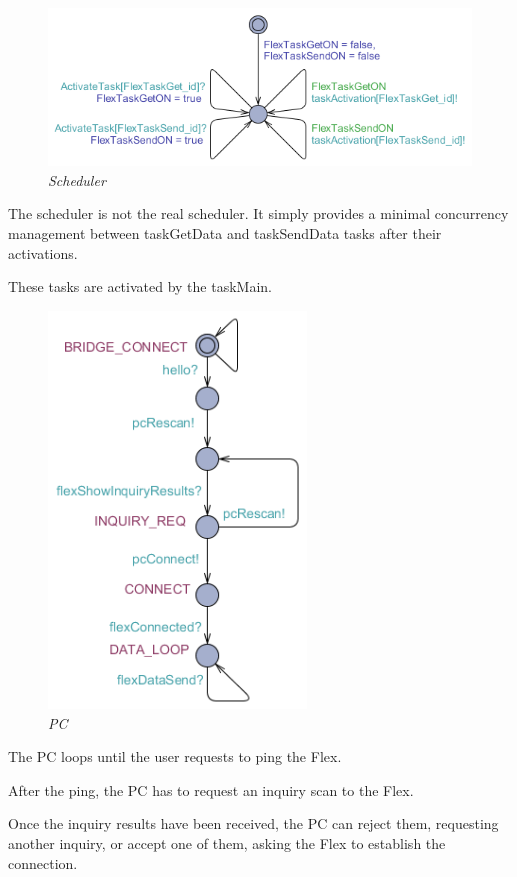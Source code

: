 \documentclass[paper=a4, fontsize=11pt]{scrartcl} %
\numberwithin{equation}{section} %
\numberwithin{figure}{section} %
\numberwithin{table}{section} %
\begin{document}
\begin{figure}[H]
  \centering
  \includegraphics[width=6in]{img/FLEX-PC_scheduler}
  \caption{\textit{Scheduler}}
\end{figure}

The scheduler is not the real scheduler. It simply provides a minimal concurrency management between taskGetData and taskSendData tasks after their activations.

These tasks are activated by the taskMain.

\begin{figure}[H]
  \centering
  \includegraphics[width=2.7in]{img/FLEX-PC_PC}
  \caption{\textit{PC}}
\end{figure}

The PC loops until the user requests to ping the Flex.

After the ping, the PC has to request an inquiry scan to the Flex.

Once the inquiry results have been received, the PC can reject them, requesting another inquiry, or accept one of them, asking the Flex to establish the connection.
\end{document}
